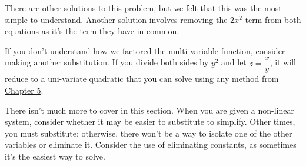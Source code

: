 \documentclass[../book.tex]{subfiles}
\begin{document}
\begin{remark}
There are other solutions to this problem, but we felt that this was the most simple to understand.  Another solution involves removing the $2x^2$ term from both equations as it's the term they have in common.
\end{remark}

If you don't understand how we factored the multi-variable function, consider making another substitution.  If you divide both sides by $y^2$ and let $z=\dfrac{x}{y}$, it will reduce to a uni-variate quadratic that you can solve using any method from \hyperlink{chapter.5}{Chapter 5}.

There isn't much more to cover in this section.  When you are given a non-linear system, consider whether it may be easier to substitute to simplify.  Other times, you must substitute; otherwise, there won't be a way to isolate one of the other variables or eliminate it.  Consider the use of eliminating constants, as sometimes it's the easiest way to solve.  
\end{document}
